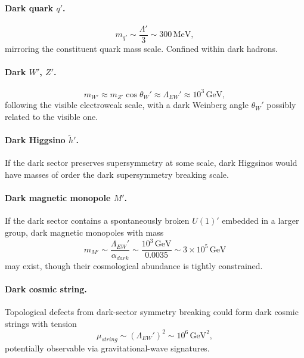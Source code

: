 \documentclass[12pt,oneside,openany]{book}
\begin{document}
\paragraph{Dark quark \texorpdfstring{$q'$}{q'}.}
\begin{equation}
m_{q'}
\sim
\frac{\Lambda'}{3}
\sim
300\,\text{MeV},
\label{eq:mq'-tier3}
\end{equation}
mirroring the constituent quark mass scale. Confined within dark
hadrons.

\paragraph{Dark \texorpdfstring{$W'$}{W'}, \texorpdfstring{$Z'$}{Z'}.}
\begin{equation}
m_{W'}
\approx
m_{Z'}
\cos\theta_{W}'
\approx
\Lambda_{EW}'
\approx
10^{3}\,\text{GeV},
\label{eq:mW'-tier3}
\end{equation}
following the visible electroweak scale, with a dark Weinberg
angle $\theta_{W}'$ possibly related to the visible one.

\paragraph{Dark Higgsino \texorpdfstring{$\tilde{h}'$}{h'}.}
If the dark sector preserves supersymmetry at some scale, dark
Higgsinos would have masses of order the dark supersymmetry
breaking scale.

\paragraph{Dark magnetic monopole \texorpdfstring{$M'$}{M'}.}
If the dark sector contains a spontaneously broken $U(1)'$
embedded in a larger group, dark magnetic monopoles with mass
\begin{equation}
m_{M'}
\sim
\frac{\Lambda_{EW}'}{\alpha_{dark}}
\sim
\frac{10^{3}\,\text{GeV}}{0.0035}
\sim
3\times 10^{5}\,\text{GeV}
\label{eq:mM'-tier3}
\end{equation}
may exist, though their cosmological abundance is tightly
constrained.

\paragraph{Dark cosmic string.}
Topological defects from dark-sector symmetry breaking could form
dark cosmic strings with tension
\begin{equation}
\mu_{string}
\sim
(\Lambda_{EW}')^{2}
\sim
10^{6}\,\text{GeV}^{2},
\label{eq:string-tension}
\end{equation}
potentially observable via gravitational-wave signatures.
\end{document}
